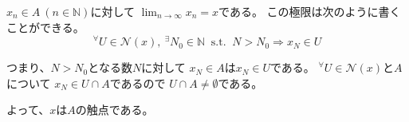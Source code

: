 \documentclass[12pt,b5paper]{ltjsarticle}
\begin{document}
\begin{enumerate}
      $x_n\in A\ (n\in\mathbb{N})$に対して
      $\lim_{n\rightarrow \infty}x_n = x$である。
      この極限は次のように書くことができる。
      \begin{equation}
       {}^{\forall}U\in\mathcal{N}(x),\
        {}^{\exists}N_0\in\mathbb{N}\
        \text{ s.t. }\
        N>N_0 \Rightarrow x_N\in U
      \end{equation}

      つまり、$N>N_0$となる数$N$に対して
      $x_N\in A$は$x_N\in U$である。
      ${}^{\forall}U\in\mathcal{N}(x)$と$A$について
      $x_N\in U\cap A$であるので
      $U\cap A \ne\emptyset$である。

      よって、$x$は$A$の触点である。


      \hrulefill

\end{enumerate}
\end{document}
